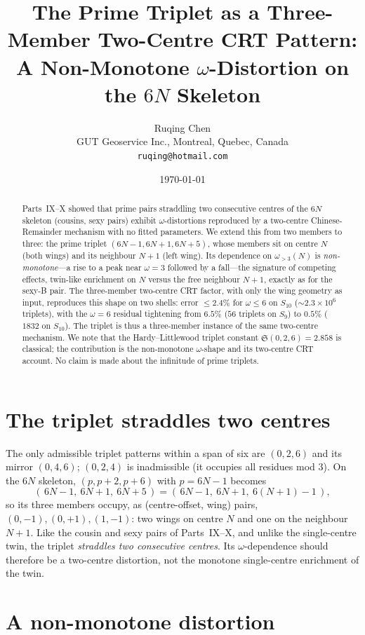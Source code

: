 \documentclass[11pt]{article}
\title{The Prime Triplet as a Three-Member Two-Centre CRT Pattern:\\
A Non-Monotone $\omega$-Distortion on the $6N$ Skeleton}
\author{Ruqing Chen\\
\small GUT Geoservice Inc., Montreal, Quebec, Canada\\
\small \texttt{ruqing@hotmail.com}}
\date{\today}
\begin{document}
\maketitle

\begin{abstract}
Parts~IX--X showed that prime pairs straddling two consecutive centres of the $6N$
skeleton (cousins, sexy pairs) exhibit $\omega$-distortions reproduced by a
two-centre Chinese-Remainder mechanism with no fitted parameters. We extend this
from two members to three: the prime triplet $(6N-1,6N+1,6N+5)$, whose members sit
on centre $N$ (both wings) and its neighbour $N+1$ (left wing). Its dependence on
$\omega_{>3}(N)$ is \emph{non-monotone}---a rise to a peak near $\omega=3$ followed
by a fall---the signature of competing effects, twin-like enrichment on $N$ versus
the free neighbour $N+1$, exactly as for the sexy-B pair. The three-member
two-centre CRT factor, with only the wing geometry as input, reproduces this shape
on two shells: error $\le2.4\%$ for $\omega\le6$ on $S_{10}$ ($\sim2.3\times10^{6}$
triplets), with the $\omega=6$ residual tightening from $6.5\%$ ($56$ triplets on
$S_9$) to $0.5\%$ ($1832$ on $S_{10}$). The triplet is thus a three-member instance
of the same two-centre mechanism. We note that the Hardy--Littlewood triplet
constant $\mathfrak{S}(0,2,6)=2.858$ is classical; the contribution is the
non-monotone $\omega$-shape and its two-centre CRT account. No claim is made about
the infinitude of prime triplets.
\end{abstract}

\section{The triplet straddles two centres}

The only admissible triplet patterns within a span of six are $(0,2,6)$ and its
mirror $(0,4,6)$; $(0,2,4)$ is inadmissible (it occupies all residues mod $3$).
On the $6N$ skeleton, $(p,p+2,p+6)$ with $p=6N-1$ becomes
\[
  (\,6N-1,\ 6N+1,\ 6N+5\,)=(\,6N-1,\ 6N+1,\ 6(N{+}1)-1\,),
\]
so its three members occupy, as (centre-offset, wing) pairs,
$(0,-1),(0,+1),(1,-1)$: two wings on centre $N$ and one on the neighbour $N+1$.
Like the cousin and sexy pairs of Parts~IX--X, and unlike the single-centre twin,
the triplet \emph{straddles two consecutive centres}. Its $\omega$-dependence
should therefore be a two-centre distortion, not the monotone single-centre
enrichment of the twin.

\section{A non-monotone distortion}
\end{document}
